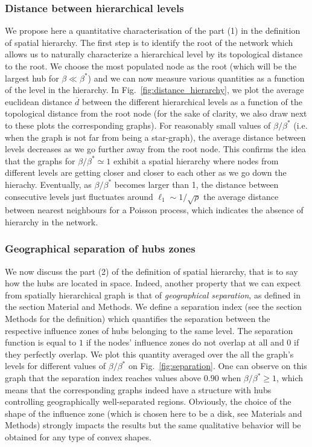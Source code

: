 \subsubsection{Distance between hierarchical levels}
 
We propose here a quantitative characterisation of the part (1) in the definition of spatial hierarchy. The first step is to identify the root of the network which allows us to naturally characterize a hierarchical level by its topological distance to the root. We choose the most populated node as the root (which will be the largest hub for $\beta\ll\beta^*$) and we can now measure various quantities as a function of the level in the hierarchy. In Fig.~\ref{fig:distance_hierarchy}, we plot the average euclidean distance $\overline{d}$ between the different hierarchical levels as a function of the topological distance from the root node (for the sake of clarity, we also draw next to these plots the corresponding graphs). For reasonably small  values of $\beta/\beta^*$ (i.e. when the graph is not far from being a star-graph), the average distance between levels decreases as we go further away from the root node. This confirms the idea that the graphs for $\beta/\beta^*\simeq 1$ exhibit a spatial hierarchy where nodes from different levels are getting closer and closer to each other as we go down the hierachy. Eventually, as $\beta/\beta^*$ becomes larger than 1, the distance between consecutive levels just fluctuates around $\ell_1\sim 1/\sqrt{\rho}$ the average distance between nearest neighbours for a Poisson process, which indicates the absence of hierarchy in the network.


\subsubsection{Geographical separation of hubs zones} 

We now discuss the part (2) of the definition of spatial hierarchy, that is to say how the hubs are located in space. Indeed, another property that we can expect from spatially hierarchical graph is that of \emph{geographical separation}, as defined in the section Material and Methods. We define a separation index (see the section Methods for the definition) which quantifies the separation between the respective influence zones of hubs belonging to the same level. The separation function is equal to $1$ if the nodes' influence zones do not overlap at all and 0 if they perfectly overlap. We plot this quantity averaged over the all the graph's levels for different values of $\beta/\beta^*$ on Fig.~\ref{fig:separation}. One can observe on this graph that the separation index reaches values above $0.90$ when $\beta/\beta^* \geq 1$, which means that the corresponding graphs indeed have a structure with hubs controlling geographically well-separated regions. Obviously, the choice of the shape of the influence zone (which is chosen here to be a disk, see Materials and Methods) strongly impacts the results but the same qualitative behavior will be obtained for any type of convex shapes.

